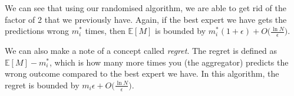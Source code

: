 \documentclass[12pt]{article}
\newcommand{\expected}{\mathbb{E}}
\begin{document}
We can see that using our randomised algorithm, we are able to get rid of the factor of 2 that we previously have. Again, if the best expert we have gets the predictions wrong $m_i^*$ times, then $\expected[M]$ is bounded by $m_i^*(1+\epsilon) + O\big(\frac{\ln N}{\epsilon}\big)$.

We can also make a note of a concept called \textit{regret}. The regret is defined as $\expected[M] - m^*_i$, which is how many more times you (the aggregator) predicts the wrong outcome compared to the best expert we have. In this algorithm, the regret is bounded by $m_i\epsilon + O\big(\frac{\ln N}{\epsilon}\big)$.
\end{document}
